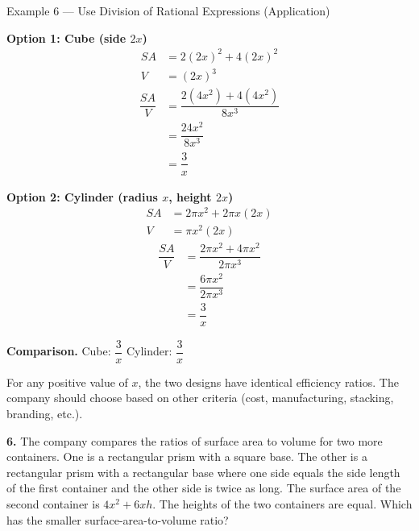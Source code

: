 \documentclass[11pt]{article}
\newcommand{\workspace}[1]{\vspace{#1}}
\begin{document}
\begin{example}{Example 6 --- Use Division of Rational Expressions (Application)}
\vspace{0.8em}
\noindent
\begin{minipage}[t]{0.48\textwidth}
\textbf{Option 1: Cube (side $2x$)}
\begin{align*}
SA &= 2(2x)^{2} + 4(2x)^{2} \\
V  &= (2x)^{3}
\end{align*}
\begin{align*}
\dfrac{SA}{V} &= \dfrac{2(4x^{2}) + 4(4x^{2})}{8x^{3}} \\[4pt]
&= \dfrac{24x^{2}}{8x^{3}} \\[4pt]
&= \dfrac{3}{x}
\end{align*}
\end{minipage}\hfill
\begin{minipage}[t]{0.48\textwidth}
\textbf{Option 2: Cylinder (radius $x$, height $2x$)}
\begin{align*}
SA &= 2\pi x^{2} + 2\pi x(2x) \\
V  &= \pi x^{2}(2x)
\end{align*}
\begin{align*}
\dfrac{SA}{V} &= \dfrac{2\pi x^{2} + 4\pi x^{2}}{2\pi x^{3}} \\[4pt]
&= \dfrac{6\pi x^{2}}{2\pi x^{3}} \\[4pt]
&= \dfrac{3}{x}
\end{align*}
\end{minipage}

\vspace{1em}
\textbf{Comparison.} \quad Cube: $\dfrac{3}{x}$ \qquad Cylinder: $\dfrac{3}{x}$

\vspace{0.5em}
\begin{annot}
For any positive value of $x$, the two designs have identical efficiency ratios. The company should choose based on other criteria (cost, manufacturing, stacking, branding, etc.).
\end{annot}
\end{example}

\begin{tryit}
\textbf{6.} The company compares the ratios of surface area to volume for two more containers. One is a rectangular prism with a square base. The other is a rectangular prism with a rectangular base where one side equals the side length of the first container and the other side is twice as long. The surface area of the second container is $4x^{2} + 6xh$. The heights of the two containers are equal. Which has the smaller surface-area-to-volume ratio?
\workspace{6cm}
\end{tryit}
\end{document}
